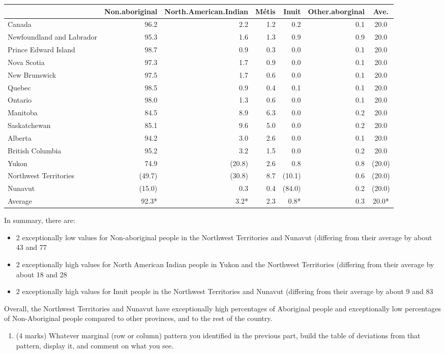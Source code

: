 \documentclass[9pt,letter]{article}
\providecommand{\tightlist}{%
  \setlength{\itemsep}{0pt}\setlength{\parskip}{0pt}}
\begin{document}
\begin{longtable}[]{@{}lrrrrrc@{}}
\toprule
& Non.aboriginal & North.American.Indian & Métis & Inuit &
Other.aborginal & Ave.\tabularnewline
\midrule
\endhead
Canada & 96.2 & 2.2 & 1.2 & 0.2 & 0.1 & 20.0\tabularnewline
Newfoundland and Labrador & 95.3 & 1.6 & 1.3 & 0.9 & 0.9 &
20.0\tabularnewline
Prince Edward Island & 98.7 & 0.9 & 0.3 & 0.0 & 0.1 &
20.0\tabularnewline
Nova Scotia & 97.3 & 1.7 & 0.9 & 0.0 & 0.1 & 20.0\tabularnewline
New Brunswick & 97.5 & 1.7 & 0.6 & 0.0 & 0.1 & 20.0\tabularnewline
Quebec & 98.5 & 0.9 & 0.4 & 0.1 & 0.1 & 20.0\tabularnewline
Ontario & 98.0 & 1.3 & 0.6 & 0.0 & 0.1 & 20.0\tabularnewline
Manitoba & 84.5 & 8.9 & 6.3 & 0.0 & 0.2 & 20.0\tabularnewline
Saskatchewan & 85.1 & 9.6 & 5.0 & 0.0 & 0.2 & 20.0\tabularnewline
Alberta & 94.2 & 3.0 & 2.6 & 0.0 & 0.1 & 20.0\tabularnewline
British Columbia & 95.2 & 3.2 & 1.5 & 0.0 & 0.2 & 20.0\tabularnewline
Yukon & 74.9 & (20.8) & 2.6 & 0.8 & 0.8 & (20.0)\tabularnewline
Northwest Territories & (49.7) & (30.8) & 8.7 & (10.1) & 0.6 &
(20.0)\tabularnewline
Nunavut & (15.0) & 0.3 & 0.4 & (84.0) & 0.2 & (20.0)\tabularnewline
Average & 92.3* & 3.2* & 2.3 & 0.8* & 0.3 & 20.0*\tabularnewline
\bottomrule
\end{longtable}

In summary, there are:

\begin{itemize}
  \item 2 exceptionally low values for Non-aboriginal people in the Northwest Territories and Nunavut (differing from their average by about 43 and 77%
  \item 2 exceptionally high values for North American Indian people in Yukon and the Northwest Territories (differing from their average by about 18 and 28%
  \item 2 exceptionally high values for Inuit people in the Northwest Territories and Nunavut (differing from their average by about 9 and 83%
\end{itemize}

Overall, the Northwest Territories and Nunavut have exceptionally high
percentages of Aboriginal people and exceptionally low percentages of
Non-Aboriginal people compared to other provinces, and to the rest of
the country.\vspace{5mm}

\begin{enumerate}
\def\labelenumi{(\alph{enumi})}
\setcounter{enumi}{2}
\tightlist
\item
  (4 marks) Whatever marginal (row or column) pattern you identified in
  the previous part, build the table of deviations from that pattern,
  display it, and comment on what you see.
\end{enumerate}
\end{document}
